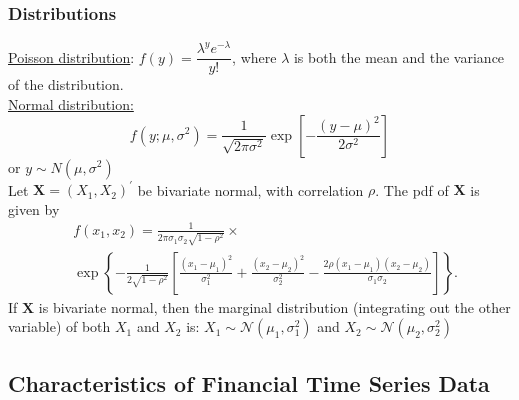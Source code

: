 \documentclass[11pt]{article}
\begin{document}
\subsubsection*{Distributions}
\begin{equation}
    \label{dist}
\end{equation}
\underline{Poisson distribution}: $f(y) = \dfrac{\lambda^y e^{-\lambda}}{y!}$, where $\lambda$ is both the mean and the variance of the distribution. \\

\noindent\underline{Normal distribution:}
\[f(y; \mu, \sigma^2) = \dfrac{1}{\sqrt{2\pi\sigma^2}}\exp{\left[ -\dfrac{(y-\mu)^2}{2\sigma^2}\right]}\] 
or $y \sim N(\mu, \sigma^2)$ \\

Let $\mathbf{X}=\left(X_1, X_2\right)^{\prime}$ be bivariate normal, with correlation $\rho$. The pdf of $\mathbf{X}$ is given by
$$
\begin{aligned}
&f\left(x_1, x_2\right)=  \frac{1}{2 \pi \sigma_1 \sigma_2 \sqrt{1-\rho^2}} \times \\
& \exp \left\{-\frac{1}{2 \sqrt{1-\rho^2}}\left[\frac{\left(x_1-\mu_1\right)^2}{\sigma_1^2}+\frac{\left(x_2-\mu_2\right)^2}{\sigma_2^2}-\frac{2 \rho\left(x_1-\mu_1\right)\left(x_2-\mu_2\right)}{\sigma_1 \sigma_2}\right]\right\} .
\end{aligned}
$$
If $\mathbf{X}$ is bivariate normal, then the marginal distribution (integrating out the other variable) of both $X_1$ and $X_2$ is: $X_1 \sim \mathcal{N}\left(\mu_1, \sigma_1^2\right)$ and $X_2 \sim \mathcal{N}\left(\mu_2, \sigma_2^2\right)$

\subsection{Characteristics of Financial Time Series Data}
\end{document}
